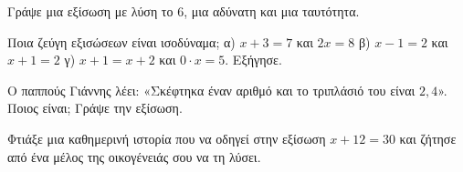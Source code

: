\ex Γράψε μια εξίσωση με λύση το $6$, μια αδύνατη και μια ταυτότητα.

\ex Ποια ζεύγη εξισώσεων είναι ισοδύναμα; α) $x+3=7$ και $2x=8$ \quad β) $x-1=2$ και $x+1=2$ \quad γ) $x+1=x+2$ και $0\cdot x=5$. Εξήγησε.


\ex Ο παππούς Γιάννης λέει: «Σκέφτηκα έναν αριθμό και το τριπλάσιό του είναι $2{,}4$». Ποιος είναι; Γράψε την εξίσωση.

\ex Φτιάξε μια καθημερινή ιστορία που να οδηγεί στην εξίσωση $x+12=30$ και ζήτησε από ένα μέλος της οικογένειάς σου να τη λύσει.

